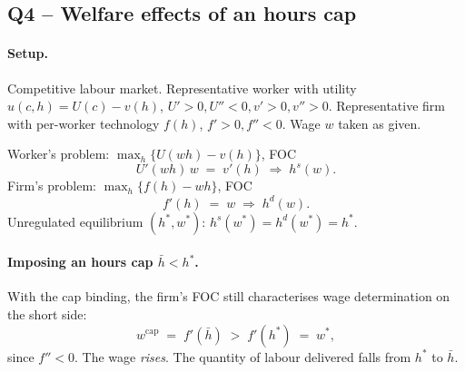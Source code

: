 \documentclass[11pt,a4paper]{article}
\begin{document}
\subsection*{Q4 -- Welfare effects of an hours cap}

\paragraph{Setup.}
Competitive labour market. Representative worker with utility $u(c,h)=U(c)-v(h)$, $U'>0,U''<0,v'>0,v''>0$. Representative firm with per-worker technology $f(h)$, $f'>0,f''<0$. Wage $w$ taken as given.

Worker's problem: $\max_{h}\{U(wh)-v(h)\}$, FOC
\begin{equation}
U'(wh)\,w\;=\;v'(h)\;\Longrightarrow\; h^{s}(w).
\label{eq:q4_labsupply}
\end{equation}
Firm's problem: $\max_{h}\{f(h)-wh\}$, FOC
\begin{equation}
f'(h)\;=\;w\;\Longrightarrow\; h^{d}(w).
\label{eq:q4_labdem}
\end{equation}
Unregulated equilibrium $(h^{*},w^{*})$: $h^{s}(w^{*})=h^{d}(w^{*})=h^{*}$.

\paragraph{Imposing an hours cap $\bar h < h^{*}$.}
With the cap binding, the firm's FOC still characterises wage determination on the short side:
\[
w^{\text{cap}}\;=\;f'(\bar h)\;>\;f'(h^{*})\;=\;w^{*},
\]
since $f''<0$. The wage \emph{rises}. The quantity of labour delivered falls from $h^{*}$ to $\bar h$.
\end{document}
